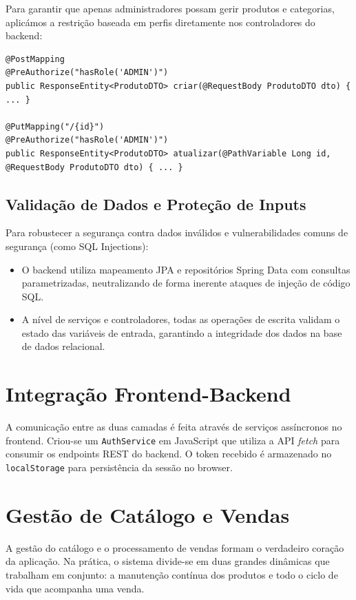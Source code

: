 \documentclass[11pt,a4paper,oneside]{report}
\begin{document}
Para garantir que apenas administradores possam gerir produtos e categorias, aplicámos a restrição baseada em perfis diretamente nos controladores do backend:
\begin{lstlisting}[caption={Anotação PreAuthorize no ProdutoController}]
@PostMapping
@PreAuthorize("hasRole('ADMIN')")
public ResponseEntity<ProdutoDTO> criar(@RequestBody ProdutoDTO dto) { ... }

@PutMapping("/{id}")
@PreAuthorize("hasRole('ADMIN')")
public ResponseEntity<ProdutoDTO> atualizar(@PathVariable Long id, @RequestBody ProdutoDTO dto) { ... }
\end{lstlisting}

\subsection{Validação de Dados e Proteção de Inputs}
Para robustecer a segurança contra dados inválidos e vulnerabilidades comuns de segurança (como SQL Injections):
\begin{itemize}
    \item O backend utiliza mapeamento JPA e repositórios Spring Data com consultas parametrizadas, neutralizando de forma inerente ataques de injeção de código SQL.
    \item A nível de serviços e controladores, todas as operações de escrita validam o estado das variáveis de entrada, garantindo a integridade dos dados na base de dados relacional.
\end{itemize}

\section{Integração Frontend-Backend}
A comunicação entre as duas camadas é feita através de serviços assíncronos no frontend. Criou-se um \texttt{AuthService} em JavaScript que utiliza a API \textit{fetch} para consumir os endpoints REST do backend. O token recebido é armazenado no \texttt{localStorage} para persistência da sessão no browser.

\section{Gestão de Catálogo e Vendas}
A gestão do catálogo e o processamento de vendas formam o verdadeiro coração da aplicação. Na prática, o sistema divide-se em duas grandes dinâmicas que trabalham em conjunto: a manutenção contínua dos produtos e todo o ciclo de vida que acompanha uma venda.
\end{document}
